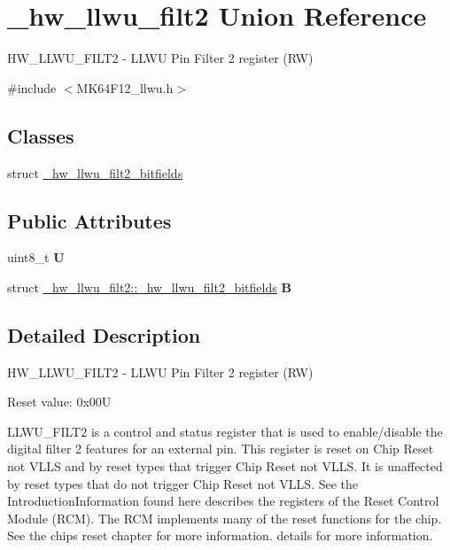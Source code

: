 \hypertarget{union__hw__llwu__filt2}{}\section{\+\_\+hw\+\_\+llwu\+\_\+filt2 Union Reference}
\label{union__hw__llwu__filt2}


H\+W\+\_\+\+L\+L\+W\+U\+\_\+\+F\+I\+L\+T2 -\/ L\+L\+WU Pin Filter 2 register (RW)  




{\ttfamily \#include $<$M\+K64\+F12\+\_\+llwu.\+h$>$}

\subsection*{Classes}
\begin{DoxyCompactItemize}
\item 
struct \hyperlink{struct__hw__llwu__filt2_1_1__hw__llwu__filt2__bitfields}{\+\_\+hw\+\_\+llwu\+\_\+filt2\+\_\+bitfields}
\end{DoxyCompactItemize}
\subsection*{Public Attributes}
\begin{DoxyCompactItemize}
\item 
uint8\+\_\+t {\bfseries U}\hypertarget{union__hw__llwu__filt2_a1bc239652b5d5bce82c168e94c83b947}{}\label{union__hw__llwu__filt2_a1bc239652b5d5bce82c168e94c83b947}

\item 
struct \hyperlink{struct__hw__llwu__filt2_1_1__hw__llwu__filt2__bitfields}{\+\_\+hw\+\_\+llwu\+\_\+filt2\+::\+\_\+hw\+\_\+llwu\+\_\+filt2\+\_\+bitfields} {\bfseries B}\hypertarget{union__hw__llwu__filt2_aa8544b80dacd80023c8e4fc7674719b0}{}\label{union__hw__llwu__filt2_aa8544b80dacd80023c8e4fc7674719b0}

\end{DoxyCompactItemize}


\subsection{Detailed Description}
H\+W\+\_\+\+L\+L\+W\+U\+\_\+\+F\+I\+L\+T2 -\/ L\+L\+WU Pin Filter 2 register (RW) 

Reset value\+: 0x00U

L\+L\+W\+U\+\_\+\+F\+I\+L\+T2 is a control and status register that is used to enable/disable the digital filter 2 features for an external pin. This register is reset on Chip Reset not V\+L\+LS and by reset types that trigger Chip Reset not V\+L\+LS. It is unaffected by reset types that do not trigger Chip Reset not V\+L\+LS. See the Introduction\+Information found here describes the registers of the Reset Control Module (R\+CM). The R\+CM implements many of the reset functions for the chip. See the chip\textquotesingle{}s reset chapter for more information. details for more information. 

